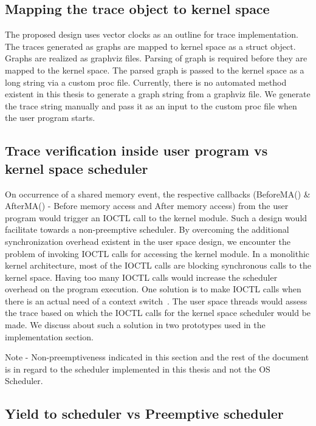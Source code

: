 \subsection{Mapping the trace object to kernel space}

The proposed design uses vector clocks as an outline for trace implementation. 
The traces generated as graphs are mapped to kernel space as a struct object. 
Graphs are realized as graphviz files. 
Parsing of graph is required before they are mapped to the kernel space. 
The parsed graph is passed to the kernel space as a long string via a custom proc file. 
Currently, there is no automated method existent in this thesis to generate a graph string from a graphviz file. 
We generate the trace string manually and pass it as an input to the custom proc file when the user program starts.

\subsection{Trace verification inside user program vs kernel space scheduler}

On occurrence of a shared memory event, the respective callbacks (BeforeMA() \& AfterMA() - Before memory access and After memory access) from the user program would trigger an IOCTL call to the kernel module. 
Such a design would facilitate towards a non-preemptive scheduler. 
By overcoming the additional synchronization overhead existent in the user space design, we encounter the problem of invoking IOCTL calls  for accessing the kernel module. 
In a monolithic kernel architecture, most of the IOCTL calls are blocking synchronous calls to the kernel space. 
Having too many IOCTL calls would increase the scheduler overhead on the program execution. 
One solution is to make IOCTL calls when there is an actual need of a  context switch~\citep{flexsc}. 
The user space threads would assess the trace based on which the IOCTL calls for the kernel space scheduler would be made. 
We discuss about such a solution in two prototypes used in the implementation section.

Note - Non-preemptiveness indicated in this section and the rest of the document is in regard to the scheduler implemented in this thesis and not the OS Scheduler.

\subsection{Yield to scheduler vs Preemptive scheduler}

